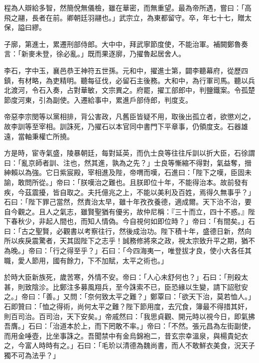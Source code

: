 \begin{pinyinscope}
 程為人辯給多智，然簡侻無儀檢，雖在華密，而無重望。最為帝所遇，嘗曰：「高飛之翮，長者在前。卿朝廷羽翮也。」武宗立，為東都留守。卒，年七十七，贈太保，謚曰繆。



 子廓，第進士，累遷刑部侍郎。大中中，拜武寧節度使，不能治軍。補闕鄭魯奏言：「新麥未登，徐必亂。」既而果逐廓，乃擢魯起居舍人。



 李石，字中玉，襄邑恭王神符五世孫。元和中，擢進士第，闢李聽幕府，從歷四鎮，有材略，為吏精明。聽每征伐，必留石主後務。大和中，為行軍司馬。聽以兵北渡河，令石入奏，占對華敏，文宗異之。府罷，擢工部郎中，判鹽鐵案。令孤楚節度河東，引為副使。入遷給事中，累進戶部侍郎，判度支。



 帝惡李宗閔等以黨相排，背公害政，凡舊臣皆疑不用，取後出孤立者，欲懲刈之，故李訓等至宰相。訓誅死，乃擢石以本官同中書門下平章事，仍領度支。石器雄遠，當軸秉權亡所撓。



 方是時，宦寺氣盛，陵暴朝廷，每對延英，而仇士良等往往斥訓以折大臣，石徐謂曰：「亂京師者訓、注也，然其進，孰為之先？」士良等慚縮不得對，氣益奪，搢紳賴以為強。它日紫宸殿，宰相進及陛，帝喟而嘆，石進曰：「陛下之嘆，臣固未諭，敢問所從。」帝曰：「朕嘆治之難也。且朕即位十年，不能得治本。故前發有疾，今茲震擾，皆自取之。夫托億兆之上，不能以美利及百姓，焉得久無事乎？」石曰：「陛下罪己當然，然責治太早，雖十年孜孜養德，適成爾。天下治不治，要自今觀之。且人之氣志，雖賢聖猶有優劣，故仲尼稱：『三十而立，四十不惑。』陛下春秋少，非起人間也，而知人情偽。今自視何如即位時？」帝曰：「有間矣。」石曰：「古之聖賢，必觀書以考察往行，然後成治功。陛下積十年，盛德日新，然向所以疾戾震驚者，天其固陛下之志乎！誠務修將來之政，視太宗致升平之期，猶不為晚。」帝曰：「行之得至乎？」石曰：「今四海夷一，唯登拔才良，使小大各任其職，愛人節用，國有餘力，下不加賦，太平之術也。」



 於時大臣新族死，歲苦寒，外情不安。帝曰：「人心未舒何也？」石曰：「刑殺太甚，則致陰沴。比鄭注多募風翔兵，至今誅索不已，臣恐緣以生變，請下詔慰安之。」帝曰：「善。」又問：「奈何致太平之難？」鄭覃曰：「欲天下治，莫若恤人。」石即贊曰：「恤之得術，尚何太平之難？陛下節用度，去冗食，簿最不得措其奸，則百司治。百司治，天下安矣。」帝戚然曰：「我思貞觀、開元時以視今日，即氣拂吾膺。」石曰：「治道本於上，而下罔敢不率。」帝曰：「不然。張元昌為左街副使，而用金唾壺，比坐事誅之。吾聞禁中有金烏錦袍二，昔玄宗幸溫泉，與楊貴妃衣之，今富人時時有之。」石曰：「毛玠以清德為魏尚書，而人不敢鮮衣美食，況天子獨不可為法乎？」




\end{pinyinscope}
